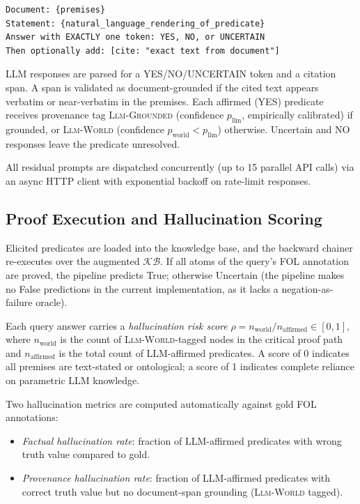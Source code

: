 \documentclass[11pt,letterpaper]{article}
\begin{document}
\begin{lstlisting}[basicstyle=\small\ttfamily, frame=single, breaklines=true]
Document: {premises}
Statement: {natural_language_rendering_of_predicate}
Answer with EXACTLY one token: YES, NO, or UNCERTAIN
Then optionally add: [cite: "exact text from document"]
\end{lstlisting}

LLM responses are parsed for a YES/NO/UNCERTAIN token and a citation span. A span is validated as document-grounded if the cited text appears verbatim or near-verbatim in the premises. Each affirmed (YES) predicate receives provenance tag \textsc{Llm-Grounded} (confidence $p_{\text{llm}}$, empirically calibrated) if grounded, or \textsc{Llm-World} (confidence $p_{\text{world}} < p_{\text{llm}}$) otherwise. Uncertain and NO responses leave the predicate unresolved.

All residual prompts are dispatched concurrently (up to 15 parallel API calls) via an async HTTP client with exponential backoff on rate-limit responses.

\subsection{Proof Execution and Hallucination Scoring}

Elicited predicates are loaded into the knowledge base, and the backward chainer re-executes over the augmented $\mathcal{KB}$. If all atoms of the query's FOL annotation are proved, the pipeline predicts True; otherwise Uncertain (the pipeline makes no False predictions in the current implementation, as it lacks a negation-as-failure oracle).

Each query answer carries a \emph{hallucination risk score} $\rho = n_{\text{world}} / n_{\text{affirmed}} \in [0,1]$, where $n_{\text{world}}$ is the count of \textsc{Llm-World}-tagged nodes in the critical proof path and $n_{\text{affirmed}}$ is the total count of LLM-affirmed predicates. A score of 0 indicates all premises are text-stated or ontological; a score of 1 indicates complete reliance on parametric LLM knowledge.

Two hallucination metrics are computed automatically against gold FOL annotations:
\begin{itemize}
  \item \emph{Factual hallucination rate}: fraction of LLM-affirmed predicates with wrong truth value compared to gold.
  \item \emph{Provenance hallucination rate}: fraction of LLM-affirmed predicates with correct truth value but no document-span grounding (\textsc{Llm-World} tagged).
\end{itemize}
\end{document}
